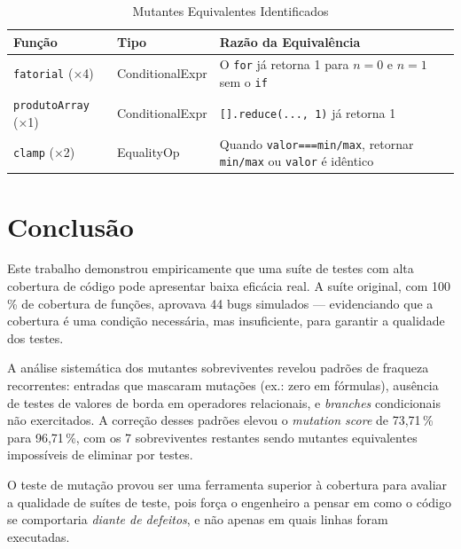\documentclass[conference]{IEEEtran}
\begin{document}
\begin{table}[H]
\caption{Mutantes Equivalentes Identificados}
\label{tab:equivalentes}
\centering
\begin{tabularx}{\columnwidth}{llX}
\toprule
\textbf{Função} & \textbf{Tipo} & \textbf{Razão da Equivalência} \\
\midrule
\texttt{fatorial} (×4)    & ConditionalExpr & O \texttt{for} já retorna 1 para $n{=}0$ e $n{=}1$ sem o \texttt{if} \\
\texttt{produtoArray} (×1) & ConditionalExpr & \texttt{[].reduce(..., 1)} já retorna 1 \\
\texttt{clamp} (×2)        & EqualityOp      & Quando \texttt{valor===min/max}, retornar \texttt{min/max} ou \texttt{valor} é idêntico \\
\bottomrule
\end{tabularx}
\end{table}

\section{Conclusão}

Este trabalho demonstrou empiricamente que uma suíte de testes com alta cobertura
de código pode apresentar baixa eficácia real. A suíte original, com 100\,\% de
cobertura de funções, aprovava 44 bugs simulados — evidenciando que a cobertura
é uma condição necessária, mas insuficiente, para garantir a qualidade dos testes.

A análise sistemática dos mutantes sobreviventes revelou padrões de fraqueza
recorrentes: entradas que mascaram mutações (ex.: zero em fórmulas), ausência de
testes de valores de borda em operadores relacionais, e \textit{branches}
condicionais não exercitados. A correção desses padrões elevou o \textit{mutation
score} de 73,71\,\% para 96,71\,\%, com os 7 sobreviventes restantes sendo
mutantes equivalentes impossíveis de eliminar por testes.

O teste de mutação provou ser uma ferramenta superior à cobertura para avaliar a
qualidade de suítes de teste, pois força o engenheiro a pensar em como o código
se comportaria \emph{diante de defeitos}, e não apenas em quais linhas foram
executadas.
\end{document}
